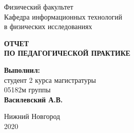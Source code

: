 \makeatletter
\begin{titlepage}

	\large\newpage

    \noindent{}

	\vspace*{50pt}

	Физический факультет \\[\baselineskip]

	Кафедра информационных технологий\\
	в физических исследованиях

	\vspace*{\fill}

	{\Large\textbf{ОТЧЕТ\\ ПО ПЕДАГОГИЧЕСКОЙ ПРАКТИКЕ}}

	\vspace*{\fill}

	\hfill\begin{minipage}{14em}
    	\textbf{Выполнил:}\\
		студент 2 курса магистратуры\\ 05182м группы\\
		\textbf{Василевский А.В.}
    \end{minipage}

	\vspace*{\fill}

	Нижний Новгород\\
	2020

\end{titlepage}
\makeatother
